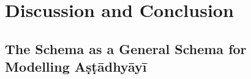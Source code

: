 \documentclass[a4paper,11pt,twoside,openright]{report}
\begin{document}
\begin{itemize}
\end{itemize}


          


 


\chapter{Discussion and Conclusion}
\label{chapter 6}

\section{The Schema as a General Schema for Modelling Aṣṭādhyāyī}
\label{sect:gen}
\end{document}
